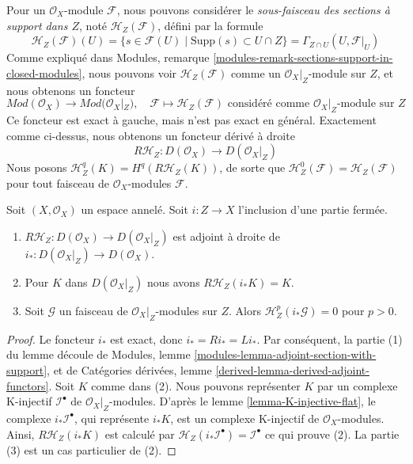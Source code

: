 \medskip\noindent
Pour un $\mathcal{O}_X$-module $\mathcal{F}$, nous pouvons considérer le {\it sous-faisceau des sections à support dans $Z$}, noté $\mathcal{H}_Z(\mathcal{F})$, défini par la formule $$
\mathcal{H}_Z(\mathcal{F})(U) =
\{s \in \mathcal{F}(U) \mid \text{Supp}(s) \subset U \cap Z\} =
\Gamma_{Z \cap U}(U, \mathcal{F}|_U)
$$ Comme expliqué dans Modules, remarque \ref{modules-remark-sections-support-in-closed-modules}, nous pouvons voir $\mathcal{H}_Z(\mathcal{F})$ comme un $\mathcal{O}_X|_Z$-module sur $Z$, et nous obtenons un foncteur $$
\textit{Mod}(\mathcal{O}_X) \longrightarrow \textit{Mod}(\mathcal{O}_X|_Z),
\quad
\mathcal{F} \longmapsto \mathcal{H}_Z(\mathcal{F})
\text{ considéré comme }\mathcal{O}_X|_Z\text{-module sur }Z
$$ Ce foncteur est exact à gauche, mais n'est pas exact en général. Exactement comme ci-dessus, nous obtenons un foncteur dérivé à droite $$
R\mathcal{H}_Z : D(\mathcal{O}_X) \longrightarrow D(\mathcal{O}_X|_Z)
$$ Nous posons $\mathcal{H}^q_Z(K) = H^q(R\mathcal{H}_Z(K))$, de sorte que $\mathcal{H}^0_Z(\mathcal{F}) = \mathcal{H}_Z(\mathcal{F})$ pour tout faisceau de $\mathcal{O}_X$-modules $\mathcal{F}$.

\begin{lemma}

\label{lemma-cohomology-with-support-sheaf-on-support}
Soit $(X, \mathcal{O}_X)$ un espace annelé. Soit $i : Z \to X$ l'inclusion d'une partie fermée.
\begin{enumerate}
\item $R\mathcal{H}_Z : D(\mathcal{O}_X) \to D(\mathcal{O}_X|_Z)$ est adjoint à droite de $i_* : D(\mathcal{O}_X|_Z) \to D(\mathcal{O}_X)$.
\item Pour $K$ dans $D(\mathcal{O}_X|_Z)$ nous avons $R\mathcal{H}_Z(i_*K) = K$.
\item Soit $\mathcal{G}$ un faisceau de $\mathcal{O}_X|_Z$-modules sur $Z$. Alors $\mathcal{H}^p_Z(i_*\mathcal{G}) = 0$ pour $p > 0$.
\end{enumerate}

\end{lemma}

\begin{proof}

Le foncteur $i_*$ est exact, donc $i_* = Ri_* = Li_*$. Par conséquent, la partie (1) du lemme découle de Modules, lemme \ref{modules-lemma-adjoint-section-with-support},
et de Catégories dérivées, lemme \ref{derived-lemma-derived-adjoint-functors}. Soit $K$ comme dans (2). Nous pouvons représenter $K$ par un complexe K-injectif
$\mathcal{I}^\bullet$ de $\mathcal{O}_X|_Z$-modules. D'après le lemme \ref{lemma-K-injective-flat},
le complexe $i_*\mathcal{I}^\bullet$, qui représente $i_*K$, est un complexe K-injectif de $\mathcal{O}_X$-modules. Ainsi,
$R\mathcal{H}_Z(i_*K)$ est calculé par
$\mathcal{H}_Z(i_*\mathcal{I}^\bullet) = \mathcal{I}^\bullet$
ce qui prouve (2). La partie (3) est un cas particulier de (2).

\end{proof}

